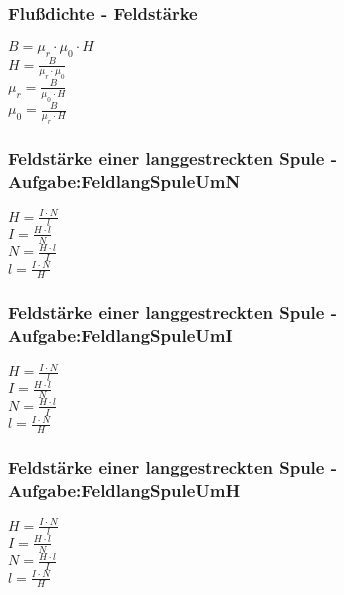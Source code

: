 \subsubsection{Flußdichte - Feldstärke} 
\begin{minipage}{0.45\textwidth} 
$ B = \mu _{r} \cdot \mu _{0} \cdot H $\\ 
$ H =\frac{ B}{\mu _{r} \cdot \mu _{0} } $\\ 
$ \mu _{r} =\frac{ B}{\mu _{0} \cdot H} $\\ 
$ \mu _{0} =\frac{ B}{\mu _{r} \cdot H} $\\ 
\end{minipage} 
\begin{minipage}{0.45\textwidth} 
 
\end{minipage} 
\subsubsection{Feldstärke einer langgestreckten Spule - Aufgabe:FeldlangSpuleUmN} 
\begin{minipage}{0.45\textwidth} 
$ H = \frac{I\cdot N}{ l} $\\ 
$ I = \frac{H\cdot l}{ N} $\\ 
$ N = \frac{H\cdot l}{ I} $\\ 
$ l = \frac{I\cdot N}{ H} $\\ 
\end{minipage} 
\begin{minipage}{0.45\textwidth} 
 
\end{minipage} 
\subsubsection{Feldstärke einer langgestreckten Spule - Aufgabe:FeldlangSpuleUmI} 
\begin{minipage}{0.45\textwidth} 
$ H = \frac{I\cdot N}{ l} $\\ 
$ I = \frac{H\cdot l}{ N} $\\ 
$ N = \frac{H\cdot l}{ I} $\\ 
$ l = \frac{I\cdot N}{ H} $\\ 
\end{minipage} 
\begin{minipage}{0.45\textwidth} 
 
\end{minipage} 
\subsubsection{Feldstärke einer langgestreckten Spule - Aufgabe:FeldlangSpuleUmH} 
\begin{minipage}{0.45\textwidth} 
$ H = \frac{I\cdot N}{ l} $\\ 
$ I = \frac{H\cdot l}{ N} $\\ 
$ N = \frac{H\cdot l}{ I} $\\ 
$ l = \frac{I\cdot N}{ H} $\\ 
\end{minipage} 
\begin{minipage}{0.45\textwidth} 
 
\end{minipage} 
